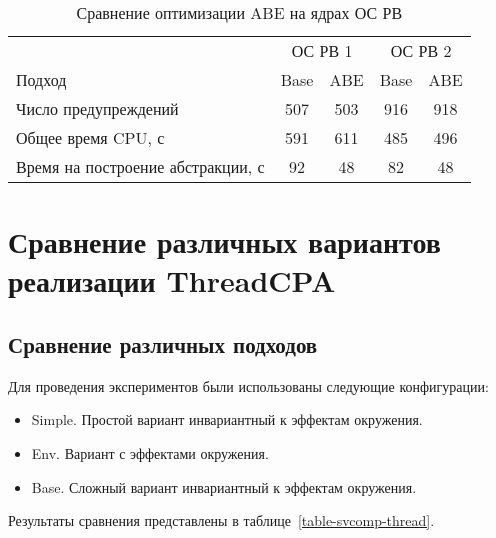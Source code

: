   \begin{table}[h]\footnotesize \centering
    \caption{Сравнение оптимизации ABE на ядрах ОС РВ}
  	\label{table-os-opt}
    \begin{tabular}{ | l | c | c | c | c |}
      \hline
      		& 		\multicolumn{2}{|c|}{ОС РВ 1} & \multicolumn{2}{|c|}{ОС РВ 2} \\
      Подход         								& Base 	& ABE 	& Base 	& ABE 		\\ \hline
      Число предупреждений 							& 507  	& 503   & 916   & 918  		\\ 
      Общее время CPU, с							& 591  	& 611   & 485   & 496  		\\ 
\hspace{0.5cm} Время на построение абстракции, с 	& 92 	& 48   	& 82 	& 48   	\\
      \hline
    \end{tabular}
  \end{table}


\section{Сравнение различных вариантов реализации ThreadCPA}

\subsection{Сравнение различных подходов }

Для проведения экспериментов были использованы следующие конфигурации:

\begin{itemize}
\item Simple. Простой вариант инвариантный к эффектам окружения.
\item Env. Вариант с эффектами окружения.
\item Base. Сложный вариант инвариантный к эффектам окружения.
\end{itemize}

Результаты сравнения представлены в таблице~\ref{table-svcomp-thread}.

